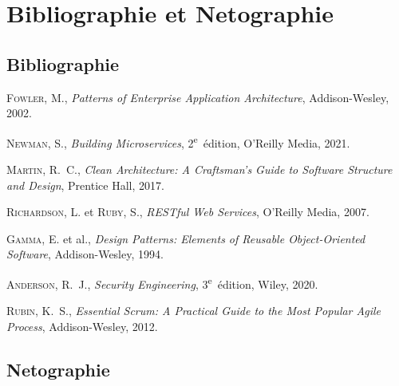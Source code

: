 \clearpage
\chapter*{Bibliographie et Netographie}

\section*{Bibliographie}

\begin{enumerate}[label={[\arabic*]}, leftmargin=1.8cm, itemsep=5pt]

  \item \textsc{Fowler}, M.,
    \textit{Patterns of Enterprise Application Architecture},
    Addison-Wesley, 2002.

  \item \textsc{Newman}, S.,
    \textit{Building Microservices},
    2\textsuperscript{e}~édition, O'Reilly Media, 2021.

  \item \textsc{Martin}, R.~C.,
    \textit{Clean Architecture: A Craftsman's Guide to Software
    Structure and Design}, Prentice Hall, 2017.

  \item \textsc{Richardson}, L. et \textsc{Ruby}, S.,
    \textit{RESTful Web Services}, O'Reilly Media, 2007.

  \item \textsc{Gamma}, E. et al.,
    \textit{Design Patterns: Elements of Reusable Object-Oriented
    Software}, Addison-Wesley, 1994.

  \item \textsc{Anderson}, R.~J.,
    \textit{Security Engineering},
    3\textsuperscript{e}~édition, Wiley, 2020.

  \item \textsc{Rubin}, K.~S.,
    \textit{Essential Scrum: A Practical Guide to the Most Popular
    Agile Process}, Addison-Wesley, 2012.

\end{enumerate}

\section*{Netographie}

